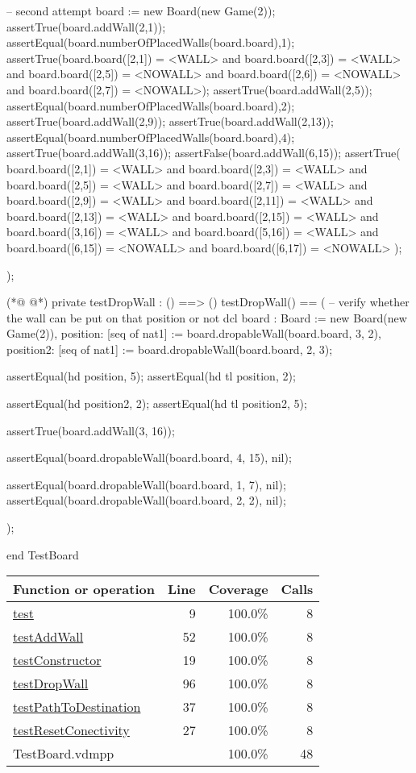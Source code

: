 \begin{vdmpp}[breaklines=true]
  -- second attempt
  board := new Board(new Game(2));
  assertTrue(board.addWall(2,1));
  assertEqual(board.numberOfPlacedWalls(board.board),1);
  assertTrue(board.board([2,1]) = <WALL> and board.board([2,3]) = <WALL> and board.board([2,5]) = <NOWALL> and board.board([2,6]) = <NOWALL> and board.board([2,7]) = <NOWALL>);
  assertTrue(board.addWall(2,5));
  assertEqual(board.numberOfPlacedWalls(board.board),2);
  assertTrue(board.addWall(2,9));
  assertTrue(board.addWall(2,13));
  assertEqual(board.numberOfPlacedWalls(board.board),4);
  assertTrue(board.addWall(3,16));
  assertFalse(board.addWall(6,15));
  assertTrue(
   board.board([2,1]) = <WALL> and board.board([2,3]) = <WALL> and board.board([2,5]) = <WALL> and
   board.board([2,7]) = <WALL> and board.board([2,9]) = <WALL> and board.board([2,11]) = <WALL> and
   board.board([2,13]) = <WALL> and board.board([2,15]) = <WALL> and board.board([3,16]) = <WALL> and   
   board.board([5,16]) = <WALL> and board.board([6,15]) = <NOWALL> and board.board([6,17]) = <NOWALL>   
  );
  
 );
 
(*@
\label{testDropWall:96}
@*)
 private testDropWall : () ==> ()
 testDropWall() ==
 (
  -- verify whether the wall can be put on that position or not
  dcl 
  board : Board := new Board(new Game(2)),
  position: [seq of nat1] := board.dropableWall(board.board, 3, 2),
  position2: [seq of nat1] := board.dropableWall(board.board, 2, 3);
  
  assertEqual(hd position, 5);
  assertEqual(hd tl position, 2);
  
  assertEqual(hd position2, 2);
  assertEqual(hd tl position2, 5);
  
  assertTrue(board.addWall(3, 16));
  
  assertEqual(board.dropableWall(board.board, 4, 15), nil);
  
  assertEqual(board.dropableWall(board.board, 1, 7), nil);
  assertEqual(board.dropableWall(board.board, 2, 2), nil);
    
 );
 
end TestBoard
\end{vdmpp}
\bigskip
\begin{longtable}{|l|r|r|r|}
\hline
Function or operation & Line & Coverage & Calls \\
\hline
\hline
\hyperref[test:9]{test} & 9&100.0\% & 8 \\
\hline
\hyperref[testAddWall:52]{testAddWall} & 52&100.0\% & 8 \\
\hline
\hyperref[testConstructor:19]{testConstructor} & 19&100.0\% & 8 \\
\hline
\hyperref[testDropWall:96]{testDropWall} & 96&100.0\% & 8 \\
\hline
\hyperref[testPathToDestination:37]{testPathToDestination} & 37&100.0\% & 8 \\
\hline
\hyperref[testResetConectivity:27]{testResetConectivity} & 27&100.0\% & 8 \\
\hline
\hline
TestBoard.vdmpp & & 100.0\% & 48 \\
\hline
\end{longtable}

